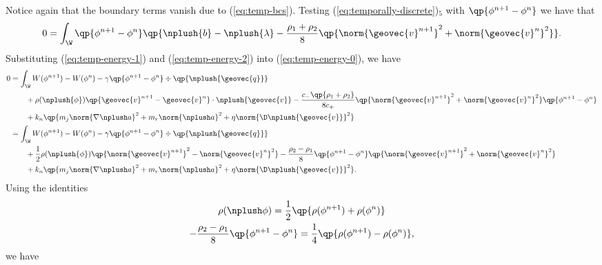 \documentclass[final]{amsart}
\numberwithin{equation}{section}
\begin{document}
\begin{Proof}
  Notice again that the boundary terms vanish due to
  (\ref{eq:temp-bcs}). Testing (\ref{eq:temporally-discrete})$_5$ with
  $\qp{\phi^{n+1} - \phi^n}$ we have that
  \begin{equation}
    \label{eq:temp-energy-2}
    0= 
    \int_\W
    \qp{\phi^{n+1} - \phi^n}
    \qp{\nplush{b}
    -
    \nplush{\lambda}
    -
    \frac{\rho_1+\rho_2}{8}
    \qp{\norm{\geovec{v}^{n+1}}^2 + \norm{\geovec{v}^{n}}^2}}.
  \end{equation}
  Substituting (\ref{eq:temp-energy-1}) and (\ref{eq:temp-energy-2})
  into (\ref{eq:temp-energy-0}), we have
  \begin{equation}
    \begin{split}
      0
      &= 
      \int_\W
      W(\phi^{n+1}) - W(\phi^n)
      -
      \gamma \qp{\phi^{n+1} - \phi^n} \div\qp{\nplush {{\geovec{q}}}}
      \\
      &\qquad +
      \rho(\nplush{\phi}) \qp{{\geovec{v}}^{n+1} - {\geovec{v}}^n} \cdot \nplush{{\geovec{v}}} 
      -
      \frac{c_-\qp{\rho_1 + \rho_2}}{8 c_+} \qp{\norm{{\geovec{v}}^{n+1}}^2 + \norm{{\geovec{v}}^n}^2} \qp{\phi^{n+1} - \phi^n}
      \\
      &\qquad 
      +
      k_n \qp{m_j\norm{\nabla \nplush a}^2
        +
        m_r \norm{\nplush a}^2
        +
        \eta \norm{\D \nplush{{\geovec{v}}}}^2}
      \\
      &=
      \int_\W
      W(\phi^{n+1}) - W(\phi^n)
      -
      \gamma \qp{\phi^{n+1} - \phi^n} \div\qp{\nplush {{\geovec{q}}}}
      \\
      &\qquad +
      \frac{1}{2}\rho(\nplush{\phi})\qp{\norm{{\geovec{v}}^{n+1}}^2 - \norm{{\geovec{v}}^n}^2} - \frac{\rho_2 - \rho_1}{8} \qp{\phi^{n+1} - \phi^n} \qp{\norm{{\geovec{v}}^{n+1}}^2 + \norm{{\geovec{v}}^n}^2} 
      \\
      &\qquad 
      +
      k_n \qp{m_j\norm{\nabla \nplush a}^2
        +
        m_r \norm{\nplush a}^2
        +
        \eta \norm{\D \nplush{{\geovec{v}}}}^2}.
    \end{split}    
  \end{equation}
  Using the identities
  \begin{gather}
    \rho(\nplush \phi) = \frac{1}{2} \qp{\rho(\phi^{n+1}) + \rho(\phi^n)}
    \\
    -\frac{\rho_2-\rho_1}{8} \qp{\phi^{n+1}-\phi^n}
    =
    \frac{1}{4} \qp{\rho(\phi^{n+1}) - \rho(\phi^n)},
  \end{gather}
  we have
  \begin{equation}

\end{equation}
\end{Proof}
\end{document}
